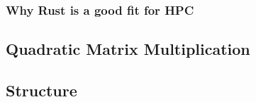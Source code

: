 \subsubsection{Why Rust is a good fit for HPC}
\subsection{Quadratic Matrix Multiplication}
\subsection{Structure}


